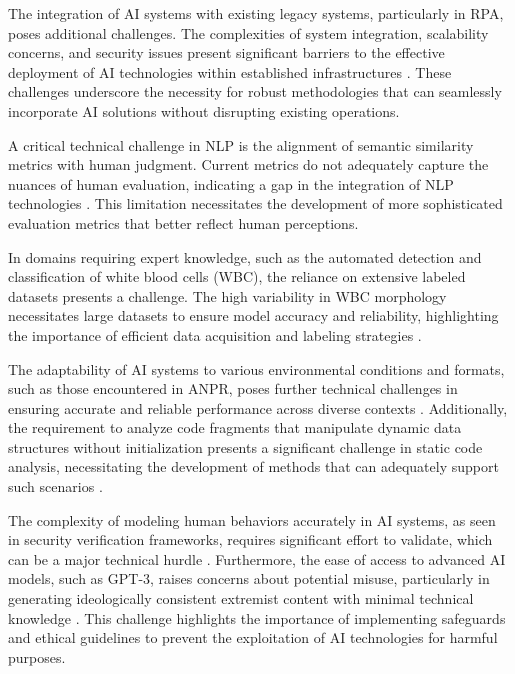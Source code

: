The integration of AI systems with existing legacy systems, particularly in RPA, poses additional challenges. The complexities of system integration, scalability concerns, and security issues present significant barriers to the effective deployment of AI technologies within established infrastructures \cite{pandy2024advancementsroboticsprocessautomation}. These challenges underscore the necessity for robust methodologies that can seamlessly incorporate AI solutions without disrupting existing operations.

A critical technical challenge in NLP is the alignment of semantic similarity metrics with human judgment. Current metrics do not adequately capture the nuances of human evaluation, indicating a gap in the integration of NLP technologies \cite{yamshchikov2020styletransferparaphraselookingsensible}. This limitation necessitates the development of more sophisticated evaluation metrics that better reflect human perceptions.

In domains requiring expert knowledge, such as the automated detection and classification of white blood cells (WBC), the reliance on extensive labeled datasets presents a challenge. The high variability in WBC morphology necessitates large datasets to ensure model accuracy and reliability, highlighting the importance of efficient data acquisition and labeling strategies \cite{zolfaghari2023surveyautomateddetectionclassification}.

The adaptability of AI systems to various environmental conditions and formats, such as those encountered in ANPR, poses further technical challenges in ensuring accurate and reliable performance across diverse contexts \cite{adak2022automaticnumberplaterecognition}. Additionally, the requirement to analyze code fragments that manipulate dynamic data structures without initialization presents a significant challenge in static code analysis, necessitating the development of methods that can adequately support such scenarios \cite{holk2022lowlevelbiabduction}.

The complexity of modeling human behaviors accurately in AI systems, as seen in security verification frameworks, requires significant effort to validate, which can be a major technical hurdle \cite{kammller2020applyingisabelleinsiderframework}. Furthermore, the ease of access to advanced AI models, such as GPT-3, raises concerns about potential misuse, particularly in generating ideologically consistent extremist content with minimal technical knowledge \cite{mcguffie2020radicalizationrisksgpt3advanced}. This challenge highlights the importance of implementing safeguards and ethical guidelines to prevent the exploitation of AI technologies for harmful purposes.

